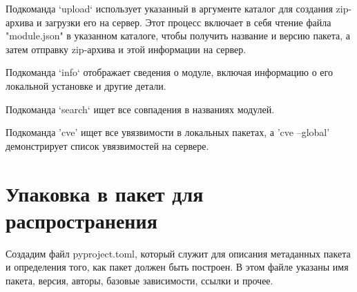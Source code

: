 Подкоманда `upload` использует указанный в аргументе каталог для создания zip-архива и загрузки его на сервер. Этот процесс включает в себя чтение файла "module.json" в указанном каталоге, чтобы получить название и версию пакета, а затем отправку zip-архива и этой информации на сервер.

Подкоманда `info` отображает сведения о модуле, включая информацию о его локальной установке и другие детали.

Подкоманда `search` ищет все совпадения в названиях модулей.

Подкоманда 'cve' ищет все увязвимости в локальных пакетах, а 'cve --global' демонстрирует список увязвимостей на сервере.

\section{Упаковка в пакет для распространения}

Создадим файл pyproject.toml, который служит для описания метаданных пакета и определения того, как пакет должен быть построен. В этом файле указаны имя пакета, версия, авторы, базовые зависимости, ссылки и прочее. 

\inputminted[fontsize=\small]{text}{../src/pyproject}



